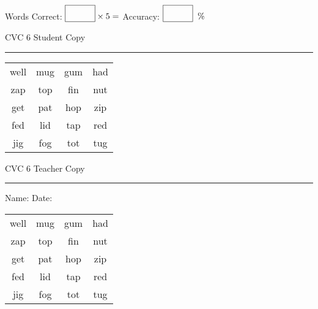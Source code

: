 \documentclass{memoir}
\begin{document}
\normalsize

Words Correct: $\fbox{\phantom{\huge 100}} \times 5 = $ Accuracy: $\fbox{\phantom{\huge 100}}\;\; \%$ 

\vfill

\newpage


\footnotesize \noindent
CVC 6 \hfill Student Copy
\smallskip
\hrule

\huge

\setlength{\tabcolsep}{14pt}
\def\arraystretch{2}

{\selectfont


\begin{vplace}[0.5]
\begin{center}
\begin{tabular}{cccc}
well & mug & gum  & had \\
zap & top & fin & nut \\
get & pat & hop & zip \\
fed & lid & tap & red \\
jig & fog & tot & tug \\
\end{tabular}
\end{center}
\end{vplace}

}

\newpage

\footnotesize \noindent
CVC 6 \hfill Teacher Copy
\smallskip
\hrule

\normalsize

\vfill

\noindent
Name: \underline{\hspace{1.75in}} \hfill Date: \underline{\hspace{1in}}

\huge

{\selectfont


\begin{vplace}[0.5]
\begin{center}
\begin{tabular}{cccc}
well & mug & gum  & had \\
zap & top & fin & nut \\
get & pat & hop & zip \\
fed & lid & tap & red \\
jig & fog & tot & tug \\
\end{tabular}
\end{center}
\end{vplace}



}
\end{document}
